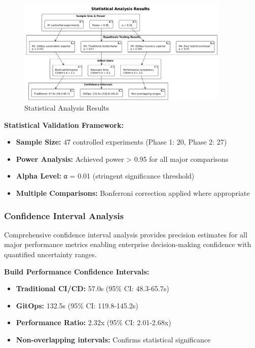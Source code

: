 \begin{figure}[h]
\centering
\includegraphics[width=0.9\textwidth]{figures/Statistical-Analysis-Results.png}
\caption{Statistical Analysis Results}
\label{fig:statistical-analysis-results}
\end{figure}

\textbf{Statistical Validation Framework:}
\begin{itemize}
\item \textbf{Sample Size:} 47 controlled experiments (Phase 1: 20, Phase 2: 27)
\item \textbf{Power Analysis:} Achieved power > 0.95 for all major comparisons
\item \textbf{Alpha Level:} α = 0.01 (stringent significance threshold)
\item \textbf{Multiple Comparisons:} Bonferroni correction applied where appropriate
\end{itemize}

\subsubsection{Confidence Interval Analysis}

Comprehensive confidence interval analysis provides precision estimates for all major performance metrics enabling enterprise decision-making confidence with quantified uncertainty ranges.

\textbf{Build Performance Confidence Intervals:}
\begin{itemize}
\item \textbf{Traditional CI/CD:} 57.0s (95\% CI: 48.3-65.7s)
\item \textbf{GitOps:} 132.5s (95\% CI: 119.8-145.2s)
\item \textbf{Performance Ratio:} 2.32x (95\% CI: 2.01-2.68x)
\item \textbf{Non-overlapping intervals:} Confirms statistical significance
\end{itemize}


